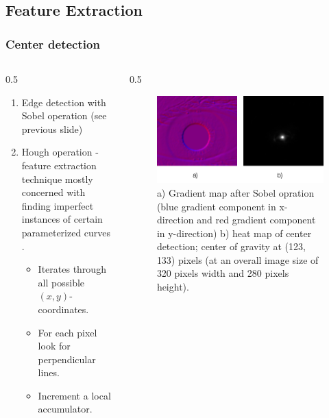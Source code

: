 \documentclass{beamer}
\begin{document}
\subsection{Feature Extraction} 
\begin{frame}
	[fragile] \frametitle{Center detection} 
	\begin{columns}
		\begin{column}
			{0.5
			\textwidth} 
			\begin{enumerate}
				[1.] 
				\item Edge detection with Sobel operation (see previous slide) 
				\item Hough operation - feature extraction technique mostly concerned with finding imperfect instances of certain parameterized curves \cite{shapiro2001computer}. 
				\begin{itemize}
					\item Iterates through all possible $(x,y)$-coordinates. 
					\item For each pixel look for perpendicular lines. 
					\item Increment a local accumulator. 
				\end{itemize}
			\end{enumerate}
		\end{column}
		\begin{column}
			{0.5
			\textwidth} 
			\begin{figure}
				[ht] \centering 
				\includegraphics[width=0.99
				\textwidth]{../report/iris/sobel_hough.png} \caption{a) Gradient map after Sobel opration (blue gradient component in x-direction and red gradient component in y-direction) b) heat map of center detection; center of gravity at (123, 133) pixels (at an overall image size of 320 pixels width and 280 pixels height).} \label{fig:sobel_hough} 
			\end{figure}
		\end{column}
	\end{columns}
\end{frame}
\end{document}
